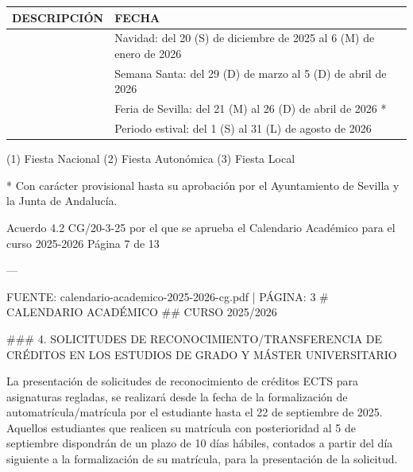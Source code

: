 \documentclass{article}
\begin{document}
\begin{itemize}
\begin{itemize}
\begin{scriptsize}
                  \vspace{0.4cm}
                  \begin{table}[h!]\centering\renewcommand{\arraystretch}{1.3}
                    \begin{tabular}{|p{}|p{}|}\hline
                      DESCRIPCIÓN & FECHA                                                              \\\hline
                                  & Navidad: del 20 (S) de diciembre de 2025 al 6 (M) de enero de 2026 \\\hline
                                  & Semana Santa: del 29 (D) de marzo al 5 (D) de abril de 2026        \\\hline
                                  & Feria de Sevilla: del 21 (M) al 26 (D) de abril de 2026 *          \\\hline
                                  & Periodo estival: del 1 (S) al 31 (L) de agosto de 2026             \\\hline
                    \end{tabular}\end{table}
                  \vspace{0.4cm}

                  (1) Fiesta Nacional
                  (2) Fiesta Autonómica
                  (3) Fiesta Local

                  * Con carácter provisional hasta su aprobación por el Ayuntamiento de Sevilla y la Junta de Andalucía.

                  Acuerdo 4.2 CG/20-3-25 por el que se aprueba el Calendario Académico para el curso 2025-2026  Página 7 de 13

                  ---

                  FUENTE: calendario-academico-2025-2026-cg.pdf | PÁGINA: 3
                  \# CALENDARIO ACADÉMICO
                  \#\# CURSO 2025/2026

                  \#\#\# 4. SOLICITUDES DE RECONOCIMIENTO/TRANSFERENCIA DE CRÉDITOS EN LOS ESTUDIOS DE GRADO Y MÁSTER UNIVERSITARIO

                  La presentación de solicitudes de reconocimiento de créditos ECTS para asignaturas regladas, se realizará desde la fecha de la formalización de automatrícula/matrícula por el estudiante hasta el 22 de septiembre de 2025. Aquellos estudiantes que realicen su matrícula con posterioridad al 5 de septiembre dispondrán de un plazo de 10 días hábiles, contados a partir del día siguiente a la formalización de su matrícula, para la presentación de la solicitud.


\end{scriptsize}
\end{itemize}
\end{itemize}
\end{document}
